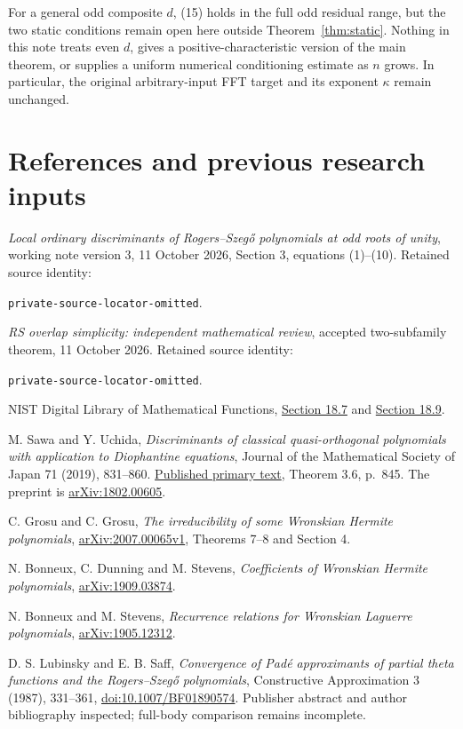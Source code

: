 \documentclass[11pt]{article}
\theoremstyle{remark}\newtheorem{remark}[theorem]{Remark}
\begin{document}
For a general odd composite $d$, (15) holds in the full odd residual
range, but the two static conditions remain open here outside
Theorem~\ref{thm:static}. Nothing in this note treats even $d$, gives a
positive-characteristic version of the main theorem, or supplies a
uniform numerical conditioning estimate as $n$ grows.
In particular, the original arbitrary-input FFT target and its
exponent $\kappa$ remain unchanged.

\clearpage
\section*{References and previous research inputs}
\begingroup\small\raggedright
\begin{enumerate}[label={[\arabic*]},leftmargin=2em]
\item \emph{Local ordinary discriminants of Rogers--Szeg\H{o}
polynomials at odd roots of unity}, working note version 3,
11 October 2026, Section 3, equations (1)--(10).
Retained source identity:\par
\nolinkurl{private-source-locator-omitted}.
\item \emph{RS overlap simplicity: independent mathematical review},
accepted two-subfamily theorem, 11 October 2026.
Retained source identity:\par
\nolinkurl{private-source-locator-omitted}.
\item NIST Digital Library of Mathematical Functions,
\href{https://dlmf.nist.gov/18.7}{Section 18.7}
and \href{https://dlmf.nist.gov/18.9}{Section 18.9}.
\item M. Sawa and Y. Uchida,
\emph{Discriminants of classical quasi-orthogonal polynomials
with application to Diophantine equations},
Journal of the Mathematical Society of Japan 71 (2019), 831--860.
\href{https://www.jstage.jst.go.jp/article/jmath/71/3/71_831/_pdf}
{Published primary text}, Theorem 3.6, p.~845.
The preprint is \href{https://arxiv.org/abs/1802.00605}{arXiv:1802.00605}.
\item C. Grosu and C. Grosu,
\emph{The irreducibility of some Wronskian Hermite polynomials},
\href{https://arxiv.org/html/2007.00065v1}{arXiv:2007.00065v1},
Theorems 7--8 and Section 4.
\item N. Bonneux, C. Dunning and M. Stevens,
\emph{Coefficients of Wronskian Hermite polynomials},
\href{https://arxiv.org/abs/1909.03874}{arXiv:1909.03874}.
\item N. Bonneux and M. Stevens,
\emph{Recurrence relations for Wronskian Laguerre polynomials},
\href{https://arxiv.org/abs/1905.12312}{arXiv:1905.12312}.
\item D. S. Lubinsky and E. B. Saff,
\emph{Convergence of Pad\'e approximants of partial theta functions
and the Rogers--Szeg\H{o} polynomials},
Constructive Approximation 3 (1987), 331--361,
\href{https://doi.org/10.1007/BF01890574}{doi:10.1007/BF01890574}.
Publisher abstract and author bibliography inspected; full-body
comparison remains incomplete.
\end{enumerate}
\endgroup
\end{document}

